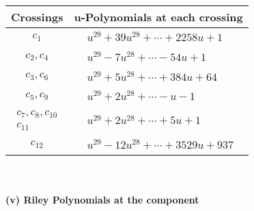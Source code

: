 \documentclass[1p]{elsarticle_modified}
\theoremstyle{definition}
\begin{document}
\begin{tabular}{m{50pt}|m{274pt}}
Crossings & \hspace{64pt}u-Polynomials at each crossing \\
\hline $$\begin{aligned}c_{1}\end{aligned}$$&$\begin{aligned}
&u^{29}+39 u^{28}+\cdots+2258 u+1
\end{aligned}$\\
\hline $$\begin{aligned}c_{2},c_{4}\end{aligned}$$&$\begin{aligned}
&u^{29}-7 u^{28}+\cdots-54 u+1
\end{aligned}$\\
\hline $$\begin{aligned}c_{3},c_{6}\end{aligned}$$&$\begin{aligned}
&u^{29}+5 u^{28}+\cdots+384 u+64
\end{aligned}$\\
\hline $$\begin{aligned}c_{5},c_{9}\end{aligned}$$&$\begin{aligned}
&u^{29}+2 u^{28}+\cdots- u-1
\end{aligned}$\\
\hline $$\begin{aligned}c_{7},c_{8},c_{10}\\c_{11}\end{aligned}$$&$\begin{aligned}
&u^{29}+2 u^{28}+\cdots+5 u+1
\end{aligned}$\\
\hline $$\begin{aligned}c_{12}\end{aligned}$$&$\begin{aligned}
&u^{29}-12 u^{28}+\cdots+3529 u+937
\end{aligned}$\\
\hline
\end{tabular}\\~\\
\newpage\renewcommand{\arraystretch}{1}
\flushleft \textbf{(v) Riley Polynomials at the component}\newline \\
\end{document}
